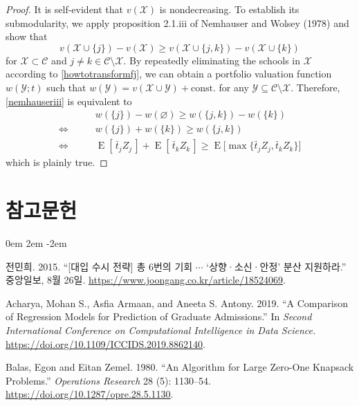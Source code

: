 \documentclass[11pt]{article} %
\newif\ifen
\theoremstyle{definition}
\theoremstyle{definition}
\begin{document}
\begin{proof}
It is self-evident that $v(\mathcal{X})$ is nondecreasing. To establish its submodularity, we apply proposition 2.1.iii of Nemhauser and Wolsey (1978) and show that
\begin{equation}\label{nemhauseriii}
v(\mathcal{X} \cup \{j\}) - v(\mathcal{X}) \geq 
v(\mathcal{X} \cup \{j, k\}) - v(\mathcal{X} \cup \{k\})
\end{equation}
for $\mathcal{X} \subset \mathcal{C}$ and $j \neq k \in \mathcal{C} \setminus \mathcal{X}$. By repeatedly eliminating the schools in $\mathcal{X}$ according to \eqref{howtotransformfj}, we can obtain a portfolio valuation function $w(\mathcal{Y}; t)$ such that $w(\mathcal{Y}) = v(\mathcal{X} \cup \mathcal{Y}) + \text{const.}$ for any $\mathcal{Y} \subseteq \mathcal{C} \setminus \mathcal{X}$. Therefore, \eqref{nemhauseriii} is equivalent to
\begin{align}
& w(\{j\}) - w(\varnothing) \geq w(\{j, k\}) - w(\{k\}) \\
\iff \qquad &w(\{j\})  +  w(\{k\})  \geq w(\{j, k\})  \\
\iff \qquad &\operatorname{E}[\,\bar t_j Z_j\,] + \operatorname{E}[\,\bar t_k Z_k\,] 
\geq \operatorname{E}\bigl[\max\{ \bar t_j Z_j, \bar t_k Z_k \} \bigr]
\end{align}
which is plainly true. 
\end{proof}


\pagebreak
\ifen \section{References} \else \section{참고문헌} \fi
\noindent

\parskip 0em
\leftskip 2em
\parindent -2em
\ifen \else
전민희. 2015. ``{[대입 수시 전략]} 총 6번의 기회 $\cdots$ `상향·소신·안정' 분산 지원하라.'' 중앙일보, 8월 26일. \url{https://www.joongang.co.kr/article/18524069}.\fi

Acharya, Mohan S., Asfia Armaan, and Aneeta S. Antony. 2019. ``A Comparison of Regression Models for Prediction of Graduate Admissions.'' In \emph{Second International Conference on Computational Intelligence in Data Science.} \url{https://doi.org/10.1109/ICCIDS.2019.8862140}.

Balas, Egon and Eitan Zemel. 1980. ``An Algorithm for Large Zero-One Knapsack Problems.'' \emph{Operations Research} 28 (5): 1130--54. \url{https://doi.org/10.1287/opre.28.5.1130}. 
\end{document}
